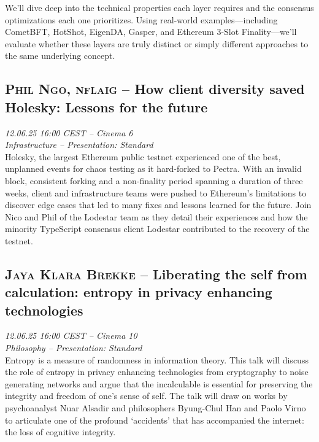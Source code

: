 We’ll dive deep into the technical properties each layer requires and the consensus optimizations each one prioritizes. Using real-world examples—including CometBFT, HotShot, EigenDA, Gasper, and Ethereum 3-Slot Finality—we’ll evaluate whether these layers are truly distinct or simply different approaches to the same underlying concept.

\clearpage
\subsection {\textsc{Phil Ngo, nflaig}  -- How client diversity saved Holesky: Lessons for the future} \noindent \textit {12.06.25 16:00 CEST -- Cinema 6\\ Infrastructure -- Presentation: Standard}\\[1em] Holesky, the largest Ethereum public testnet experienced one of the best, unplanned events for chaos testing as it hard-forked to Pectra. With an invalid block, consistent forking and a non-finality period spanning a duration of three weeks, client and infrastructure teams were pushed to Ethereum's limitations to discover edge cases that led to many fixes and lessons learned for the future. Join Nico and Phil of the Lodestar team as they detail their experiences and how the minority TypeScript consensus client Lodestar contributed to the recovery of the testnet.

\clearpage
\subsection {\textsc{Jaya Klara Brekke}  -- Liberating the self from calculation: entropy in privacy enhancing technologies} \noindent \textit {12.06.25 16:00 CEST -- Cinema 10\\ Philosophy -- Presentation: Standard}\\[1em] Entropy is a measure of randomness in information theory. This talk will discuss the role of entropy in privacy enhancing technologies from cryptography to noise generating networks and argue that the incalculable is essential for preserving the integrity and freedom of one's sense of self. The talk will draw on works by psychoanalyst Nuar Alsadir and philosophers Byung-Chul Han and Paolo Virno to articulate one of the profound `accidents' that has accompanied the internet: the loss of cognitive integrity.

\clearpage
